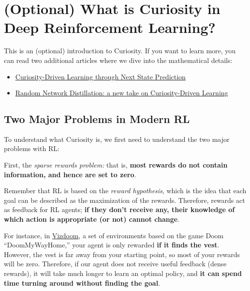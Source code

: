 \documentclass[11pt,a4paper]{article}
\begin{document}
\section{(Optional) What is Curiosity in Deep Reinforcement Learning?}\label{optional-what-is-curiosity-in-deep-reinforcement-learning}

This is an (optional) introduction to Curiosity. If you want to learn more, you can read two additional articles where we dive into the mathematical details:

\begin{itemize}
\tightlist
\item
  \href{https://medium.com/data-from-the-trenches/curiosity-driven-learning-through-next-state-prediction-f7f4e2f592fa}{Curiosity-Driven Learning through Next State Prediction}
\item
  \href{https://medium.com/data-from-the-trenches/curiosity-driven-learning-through-random-network-distillation-488ffd8e5938}{Random Network Distillation: a new take on Curiosity-Driven Learning}
\end{itemize}

\subsection{Two Major Problems in Modern RL}\label{two-major-problems-in-modern-rl}

To understand what Curiosity is, we first need to understand the two major problems with RL:

First, the \emph{sparse rewards problem:} that is, \textbf{most rewards do not contain information, and hence are set to zero}.

Remember that RL is based on the \emph{reward hypothesis}, which is the idea that each goal can be described as the maximization of the rewards. Therefore, rewards act as feedback for RL agents; \textbf{if they don't receive any, their knowledge of which action is appropriate (or not) cannot change}.


For instance, in \href{https://vizdoom.cs.put.edu.pl/}{Vizdoom}, a set of environments based on the game Doom ``DoomMyWayHome,'' your agent is only rewarded \textbf{if it finds the vest}. However, the vest is far away from your starting point, so most of your rewards will be zero. Therefore, if our agent does not receive useful feedback (dense rewards), it will take much longer to learn an optimal policy, and \textbf{it can spend time turning around without finding the goal}.
\end{document}
